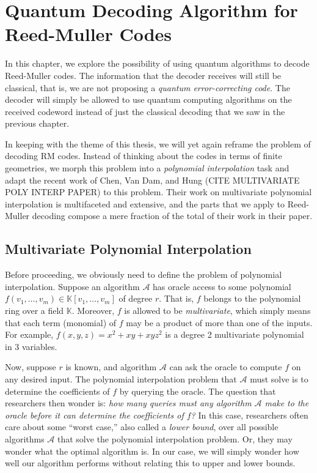 \documentclass[12pt,twoside]{reedthesis}
\theoremstyle{definition}
\newcommand{\K}{\mathbb{K}}
\begin{document}
\chapter{Quantum Decoding Algorithm for Reed-Muller Codes}
In this chapter, we explore the possibility of using quantum algorithms to decode Reed-Muller codes. The information that the decoder receives will still be classical, that is, we are not proposing a \textit{quantum error-correcting code}. The decoder will simply be allowed to use quantum computing algorithms on the received codeword instead of just the classical decoding that we saw in the previous chapter.

In keeping with the theme of this thesis, we will yet again reframe the problem of decoding RM codes. Instead of thinking about the codes in terms of finite geometries, we morph this problem into a \textit{polynomial interpolation} task and adapt the recent work of Chen, Van Dam, and Hung (CITE MULTIVARIATE POLY INTERP PAPER) to this problem. Their work on multivariate polynomial interpolation is multifaceted and extensive, and the parts that we apply to Reed-Muller decoding compose a mere fraction of the total of their work in their paper. 

\section{Multivariate Polynomial Interpolation}
Before proceeding, we obviously need to define the problem of polynomial interpolation. Suppose an algorithm $\mathcal{A}$ has oracle access to some polynomial $f(v_1, \ldots, v_m) \in \K[v_1, \ldots, v_m]$ of degree $r$. That is, $f$ belongs to the polynomial ring over a field $\K$. Moreover, $f$ is allowed to be \textit{multivariate}, which simply means that each term (monomial) of $f$ may be a product of more than one of the inputs. For example, $f(x,y,z) = x^2 + xy + xyz^2$ is a degree 2 multivariate polynomial in 3 variables.

Now, suppose $r$ is known, and algorithm $\mathcal{A}$ can ask the oracle to compute $f$ on any desired input. The polynomial interpolation problem that $\mathcal{A}$ must solve is to determine the coefficients of $f$ by querying the oracle. The question that researchers then wonder is: \textit{how many queries must any algorithm $\mathcal{A}$ make to the oracle before it can determine the coefficients of $f$?} In this case, researchers often care about some ``worst case,'' also called a \textit{lower bound}, over all possible algorithms $\mathcal{A}$ that solve the polynomial interpolation problem. Or, they may wonder what the optimal algorithm is. In our case, we will simply wonder how well our algorithm performs without relating this to upper and lower bounds. 
\end{document}
